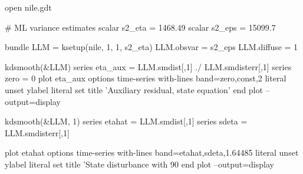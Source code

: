 \begin{script}[htbp]
\begin{scode}
open nile.gdt

# ML variance estimates
scalar s2_eta = 1468.49
scalar s2_eps = 15099.7

bundle LLM = ksetup(nile, 1, 1, s2_eta)
LLM.obsvar = s2_eps
LLM.diffuse = 1

kdsmooth(&LLM)
series eta_aux = LLM.smdist[,1] ./ LLM.smdisterr[,1]
series zero = 0
plot eta_aux
    options time-series with-lines band=zero,const,2
    literal unset ylabel
    literal set title 'Auxiliary residual, state equation'
end plot --output=display

kdsmooth(&LLM, 1)
series etahat = LLM.smdist[,1]
series sdeta = LLM.smdisterr[,1]

plot etahat
    options time-series with-lines band=etahat,sdeta,1.64485
    literal unset ylabel
    literal set title 'State disturbance with 90%
end plot --output=display
\end{scode}
\end{script}

